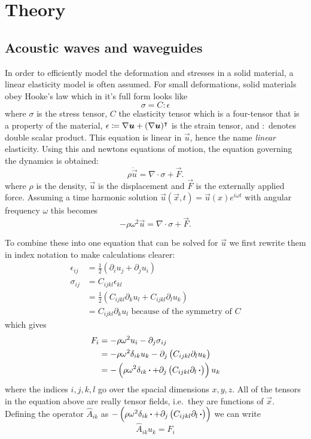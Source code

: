 \chapter{Theory}

\section{Acoustic waves and waveguides}

In order to efficiently model the deformation and stresses in a solid material,
a linear elasticity model is often assumed.
For small deformations, solid materials obey Hooke's law which in it's full form
looks like
\[
	\sigma = C : \epsilon
\]
where $\sigma$ is the stress tensor, $C$ the elasticity tensor which is a
four-tensor that is a property of the material,
$\epsilon \coloneqq \nabla \bm u + (\nabla \bm u)^\intercal$
is the strain tensor, and $:$ denotes double scalar product.
This equation is linear in $\vec u$, hence the name \emph{linear} elasticity.
Using this and newtons equations of motion, the equation governing the dynamics
is obtained:
\[
	\rho \ddot{\vec{u}} = \nabla \cdot \sigma + \vec F.
\]
where $\rho$ is the density, $\vec{u}$ is the displacement and $\vec F$ is the
externally applied force.
Assuming a time harmonic solution
$\vec u(\vec x, t) = \vec u(x) e^{i \omega t}$
with angular frequency $\omega$ this becomes
\[
	-\rho \omega^2 \vec{u} = \nabla \cdot \sigma + \vec F.
\]

To combine these into one equation that can be solved for $\vec{u}$ we first
rewrite them in index notation to make calculations clearer:
\begin{align}
	\epsilon_{ij} &= \frac12(\partial_i u_j + \partial_j u_i)\\
	\sigma_{ij} &= C_{ijkl} \epsilon_{kl}\\
				&= \frac12\left(C_{ijkl} \partial_k u_l + C_{ijkl} \partial_l
				u_k\right)\\
				&= C_{ijkl} \partial_k u_l\text{ because of the symmetry of $C$}
\end{align}
which gives
\begin{align}
	F_{i} &= -\rho \omega^2 u_{i} - \partial_j \sigma_{ij}\\
		   &= -\rho \omega^2 \delta_{ik} u_{k} -
		   \partial_j \left(C_{ijkl} \partial_l u_k\right)\\
		   &= -\left(\rho \omega^2 \delta_{ik} \operatorname{\boldsymbol{\cdot}} + 
		   \partial_j \left(C_{ijkl} \partial_l \operatorname{\boldsymbol{\cdot}}\right)\right) u_k
\end{align}
where the indices $i,j,k,l$ go over the spacial dimensions $x,y,z$.
All of the tensors in the equation above are really tensor fields, i.e.\ they are
functions of $\vec{x}$.
Defining the operator $\hat A_{ik}$ as
$-\left(\rho \omega^2 \delta_{ik} \operatorname{\boldsymbol{\cdot}} + 
\partial_j \left(C_{ijkl} \partial_l \operatorname{\boldsymbol{\cdot}}\right)\right)$
we can write
\begin{equation}\label{eq:gov_eq}
	\hat A_{ik} u_k = F_i
\end{equation}

